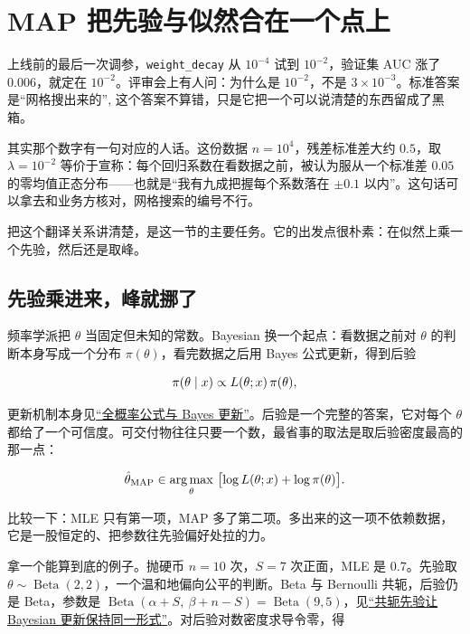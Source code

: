 \section{MAP 把先验与似然合在一个点上}
\label{sec:11-Mathematical-Statistics/02-Point-Estimation/04}

上线前的最后一次调参，\texttt{weight\_decay} 从 \(10^{-4}\) 试到 \(10^{-2}\)，验证集 AUC 涨了 \(0.006\)，就定在 \(10^{-2}\)。评审会上有人问：为什么是 \(10^{-2}\)，不是 \(3\times 10^{-3}\)。标准答案是``网格搜出来的'', 这个答案不算错，只是它把一个可以说清楚的东西留成了黑箱。

其实那个数字有一句对应的人话。这份数据 \(n=10^{4}\)，残差标准差大约 \(0.5\)，取 \(\lambda=10^{-2}\) 等价于宣称：每个回归系数在看数据之前，被认为服从一个标准差 \(0.05\) 的零均值正态分布——也就是``我有九成把握每个系数落在 \(\pm 0.1\) 以内''。这句话可以拿去和业务方核对，网格搜索的编号不行。

把这个翻译关系讲清楚，是这一节的主要任务。它的出发点很朴素：在似然上乘一个先验，然后还是取峰。

\subsection{先验乘进来，峰就挪了}

频率学派把 \(\theta\) 当固定但未知的常数。Bayesian 换一个起点：看数据之前对 \(\theta\) 的判断本身写成一个分布 \(\pi(\theta)\)，看完数据之后用 Bayes 公式更新，得到后验

\[
\pi(\theta\mid x)\propto L(\theta;x)\,\pi(\theta),
\]

更新机制本身见\hyperref[sec:05-Probability/02-Conditional-Probability/02]{``全概率公式与 Bayes 更新''}。后验是一个完整的答案，它对每个 \(\theta\) 都给了一个可信度。可交付物往往只要一个数，最省事的取法是取后验密度最高的那一点：

\[
\hat\theta_{\mathrm{MAP}}\in\argmax_\theta\ \bigl[\log L(\theta;x)+\log\pi(\theta)\bigr].
\]

比较一下：MLE 只有第一项，MAP 多了第二项。多出来的这一项不依赖数据，它是一股恒定的、把参数往先验偏好处拉的力。

拿一个能算到底的例子。抛硬币 \(n=10\) 次，\(S=7\) 次正面，MLE 是 \(0.7\)。先验取 \(\theta\sim\operatorname{Beta}(2,2)\)，一个温和地偏向公平的判断。Beta 与 Bernoulli 共轭，后验仍是 Beta，参数是 \(\operatorname{Beta}(\alpha+S,\ \beta+n-S)=\operatorname{Beta}(9,5)\)，见\hyperref[sec:13-Machine-Learning/06-Probabilistic-Models/07]{``共轭先验让 Bayesian 更新保持同一形式''}。对后验对数密度求导令零，得

